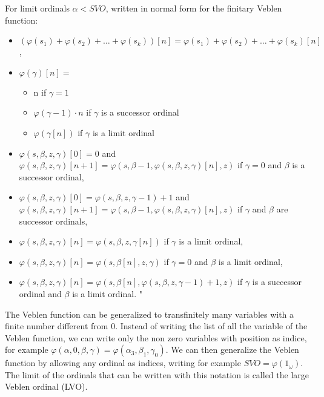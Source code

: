 \documentclass[10pt]{article}
\begin{document}
For limit ordinals \(\alpha<SVO\), written in normal form for the finitary Veblen function:

\begin{itemize}
     \setlength{\itemsep}{1pt}
     \setlength{\parskip}{0pt}
     \setlength{\parsep}{0pt}

\item \((\varphi(s_1)+\varphi(s_2)+\ldots+\varphi(s_k))[n]=\varphi(s_1)+\varphi(s_2)+\ldots+\varphi(s_k)[n]\),
\item \(\varphi(\gamma)[n]=\)
\begin{itemize}
     \setlength{\itemsep}{1pt}
     \setlength{\parskip}{0pt}
     \setlength{\parsep}{0pt}
\item n if \( \gamma=1 \)
\item \(\varphi(\gamma-1)\cdot n \) if \( \gamma \) is a successor ordinal
\item \( \varphi(\gamma[n]) \) if \( \gamma \) is a limit ordinal
\end{itemize}
\item \(\varphi(s,\beta,z,\gamma)[0]=0\) and \(\varphi(s,\beta,z,\gamma)[n+1]=\varphi(s,\beta-1,\varphi(s,\beta,z,\gamma)[n],z)\) if \(\gamma=0\) and \(\beta\) is a successor ordinal,
\item \(\varphi(s,\beta,z,\gamma)[0]=\varphi(s,\beta,z,\gamma-1)+1\) and \(\varphi(s,\beta,z,\gamma)[n+1]=\varphi(s,\beta-1,\varphi(s,\beta,z,\gamma)[n],z)\) if \(\gamma\) and \(\beta\) are successor ordinals,
\item \(\varphi(s,\beta,z,\gamma)[n]=\varphi(s,\beta,z,\gamma[n])\) if \(\gamma\) is a limit ordinal,
\item \(\varphi(s,\beta,z,\gamma)[n]=\varphi(s,\beta[n],z,\gamma)\) if \(\gamma=0\) and \(\beta\) is a limit ordinal,
\item \(\varphi(s,\beta,z,\gamma)[n]=\varphi(s,\beta[n],\varphi(s,\beta,z,\gamma-1)+1,z)\) if \(\gamma\) is a successor ordinal and \(\beta\) is a limit ordinal. "

\end{itemize}

The Veblen function can be generalized to transfinitely many variables with a finite number different from 0. Instead of writing the list of all the variable of the Veblen function, we can write only the non zero variables with position as indice, for example \( \varphi(\alpha,0,\beta,\gamma) = \varphi(\alpha_3,\beta_1,\gamma_0) \). We can then generalize the Veblen function by allowing any ordinal as indices, writing for example \( SVO = \varphi(1_\omega) \). The limit of the ordinals that can be written with this notation is called the large Veblen ordinal (LVO).
\end{document}
